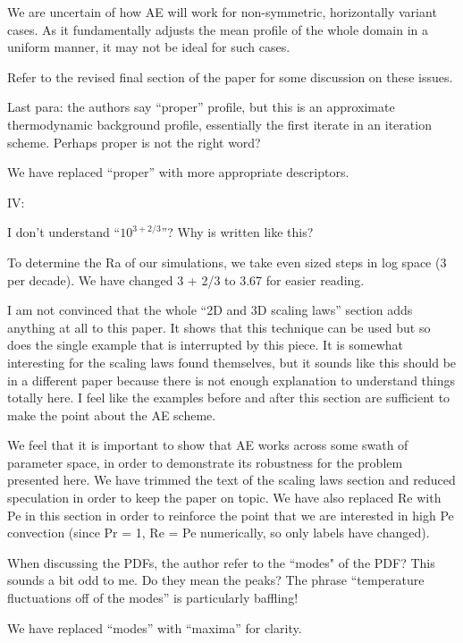\documentclass[aps, 11pt, singlecolumn]{revtex4-1} %
\begin{document}
\begin{singlespace}
We are uncertain of 
how AE will work for non-symmetric, horizontally variant cases. As it fundamentally
adjusts the mean profile of the whole domain in a uniform manner, it may not be
ideal for such cases. 

Refer to the revised final section of the paper for some discussion on these
issues.

\begin{myquotation}
Last para: the authors say “proper” profile, but this is an
approximate thermodynamic background profile, essentially the first
iterate in an iteration scheme. Perhaps proper is not the right word?
\end{myquotation}
We have replaced ``proper'' with more appropriate descriptors.

\begin{myquotation}
IV:

I don’t understand ``$10^{3+2/3}$''? Why is written like this?
\end{myquotation}
To determine the Ra of our simulations, we take even sized steps in log space
(3 per decade). We have changed 3 + 2/3 to 3.67 for easier reading.


\begin{myquotation}
I am not convinced that the whole ``2D and 3D scaling laws'' section
adds anything at all to this paper. It shows that this technique can
be used but so does the single example that is interrupted by this
piece. It is somewhat interesting for the scaling laws found
themselves, but it sounds like this should be in a different paper
because there is not enough explanation to understand things totally
here. I feel like the examples before and after this section are
sufficient to make the point about the AE scheme.
\end{myquotation}
We feel that it is important to show that AE works across some swath of parameter
space, in order to demonstrate its robustness for the problem presented here.
We have trimmed the text of the scaling laws section and reduced speculation in
order to keep the paper on topic. We have also replaced Re with Pe in this
section in order to reinforce the point that we are interested in high Pe
convection (since Pr = 1, Re = Pe numerically, so only labels have changed).

\begin{myquotation}
When discussing the PDFs, the author refer to the ``modes" of the PDF?
This sounds a bit odd to me. Do they mean the peaks? The phrase
``temperature fluctuations off of the modes'' is particularly baffling!
\end{myquotation}
We have replaced ``modes'' with ``maxima'' for clarity.


\end{singlespace}
\end{document}
